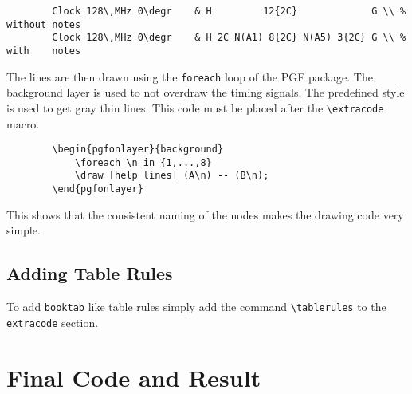 \documentclass[border=3mm]{standalone}
\def\degr{${}^\circ$}
\begin{document}
	\begin{verbatim}
		Clock 128\,MHz 0\degr    & H         12{2C}             G \\ % without notes
		Clock 128\,MHz 0\degr    & H 2C N(A1) 8{2C} N(A5) 3{2C} G \\ % with    notes
	\end{verbatim}
	
	The lines are then drawn using the \texttt{foreach} loop of the PGF package.
	The background layer is used to not overdraw the timing signals. The predefined 
	style  is used to get gray thin lines.
	This code must be placed after the \verb+\extracode+ macro.
	
	\begin{verbatim}
		\begin{pgfonlayer}{background}
			\foreach \n in {1,...,8}
			\draw [help lines] (A\n) -- (B\n);
		\end{pgfonlayer}
	\end{verbatim}
	
	This shows that the consistent naming of the nodes makes the drawing code very 
	simple.
	
	\subsection{Adding Table Rules}
	To add \texttt{booktab} like table rules simply add the command 
	\verb+\tablerules+ to the \texttt{extracode} section.
	
	\section{Final Code and Result}
	
\end{document}
